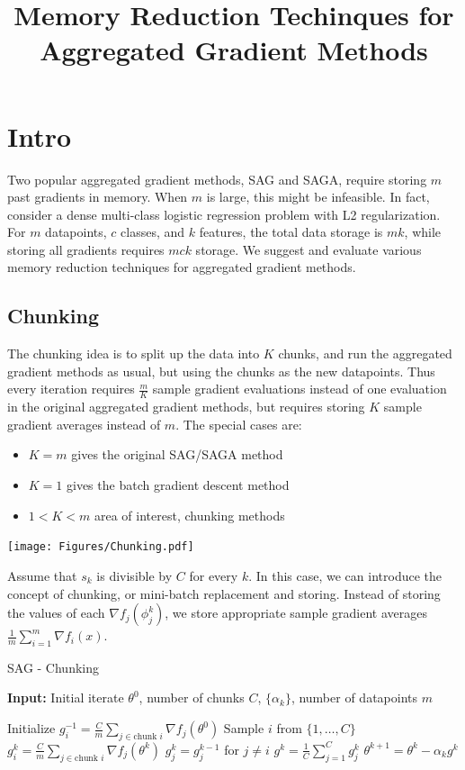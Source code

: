 \documentclass[11pt]{article}
\title{Memory Reduction Techinques for Aggregated Gradient Methods}
\begin{document}
\newpage

\section{Intro}

	Two popular aggregated gradient methods, SAG and SAGA, require storing $m$ past gradients in memory. When $m$ is large, this might be infeasible. In fact, consider a dense multi-class logistic regression problem with L2 regularization. For $m$ datapoints, $c$ classes, and $k$ features, the total data storage is $m k$, while storing all gradients requires $mck$ storage. We suggest and evaluate various memory reduction techniques for aggregated gradient methods.
	
\subsection{Chunking}

The chunking idea is to split up the data into $K$ chunks, and run the aggregated gradient methods as usual, but using the chunks as the new datapoints. Thus every iteration requires $\frac{m}{K}$ sample gradient evaluations instead of one evaluation in the original aggregated gradient methods, but requires storing $K$ sample gradient averages instead of $m$. The special cases are:
\begin{itemize}
	\item $K=m$ gives the original SAG/SAGA method
	\item $K=1$ gives the batch gradient descent method
	\item $1<K<m$ area of interest, chunking methods
\end{itemize}
\texttt{[image: Figures/Chunking.pdf]}
	
		Assume that $s_k$ is divisible by $C$ for every $k$. In this case, we can introduce the concept of chunking, or mini-batch replacement and storing. Instead of storing the values of each $ \nabla f_j(\phi_j^k)$, we store appropriate sample gradient averages $\frac{1}{m} \sum_{i=1}^m  \nabla f_i(x)$.

	\begin{algorithm}
		[H] 
		\caption{SAG - Chunking}
		\label{alg:sag-chunking}
		{\bf Input:} Initial iterate $\theta^0$, number of chunks $C$, $\{ \alpha_k \}$, number of datapoints $m$
		\begin{algorithmic}
			[1] 
			\State Initialize $g_i^{-1} = \frac{C}{m} \sum_{j \in \mbox{chunk } i }  \nabla f_{j}(\theta^0) $
			\State Sample $i$ from $\{ 1, \ldots, C \}$
			\State $ g_i^k = \frac{C}{m} \sum_{j \in \mbox{chunk } i }  \nabla f_{j}(\theta^k) $ 
			\State $ g_j^k = g_j^{k-1} $ for $j \neq i$ 
			\State $g^k = \frac{1}{C} \sum_{j=1}^C g_j^k$ 
			\State $\theta^{k+1} = \theta^k - \alpha_k g^k$ 
			\EndLoop 
		\end{algorithmic}
	\end{algorithm}
\end{document}
